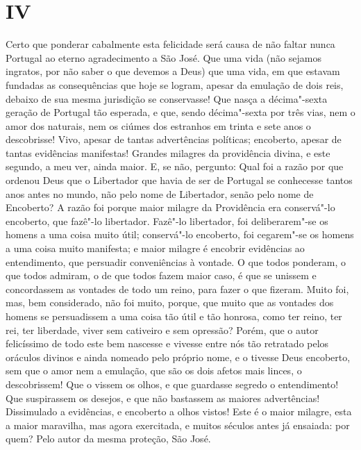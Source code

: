 \section*{IV}

Certo que ponderar cabalmente esta felicidade será causa de não faltar
nunca Portugal ao eterno agradecimento a São José. Que uma vida (não
sejamos ingratos, por não saber o que devemos a Deus) que uma vida, em
que estavam fundadas as consequências que hoje se logram, apesar da
emulação de dois reis, debaixo de sua mesma jurisdição se conservasse!
Que nasça a décima"-sexta geração de Portugal tão esperada, e que, sendo
décima"-sexta por três vias, nem o amor dos naturais, nem os ciúmes dos
estranhos em trinta e sete anos o descobrisse! Vivo, apesar de tantas
advertências políticas; encoberto, apesar de tantas evidências
manifestas! Grandes milagres da providência divina, e este segundo, a
meu ver, ainda maior. E, se não, pergunto: Qual foi a razão por que
ordenou Deus que o Libertador que havia de ser de Portugal se conhecesse
tantos anos antes no mundo, não pelo nome de Libertador, senão pelo nome
de Encoberto? A razão foi porque maior milagre da Providência era
conservá"-lo encoberto, que fazê"-lo libertador. Fazê"-lo libertador, foi
deliberarem"-se os homens a uma coisa muito útil; conservá"-lo encoberto,
foi cegarem"-se os homens a uma coisa muito manifesta; e maior milagre é
encobrir evidências ao entendimento, que persuadir conveniências à
vontade. O que todos ponderam, o que todos admiram, o de que todos fazem
maior caso, é que se unissem e concordassem as vontades de todo um
reino, para fazer o que fizeram. Muito foi, mas, bem considerado, não
foi muito, porque, que muito que as vontades dos homens se persuadissem
a uma coisa tão útil e tão honrosa, como ter reino, ter rei, ter
liberdade, viver sem cativeiro e sem opressão? Porém, que o autor
felicíssimo de todo este bem nascesse e vivesse entre nós tão retratado
pelos oráculos divinos e ainda nomeado pelo próprio nome, e o tivesse
Deus encoberto, sem que o amor nem a emulação, que são os dois afetos
mais linces, o descobrissem! Que o vissem os olhos, e que guardasse
segredo o entendimento! Que suspirassem os desejos, e que não bastassem
as maiores advertências! Dissimulado a evidências, e encoberto a olhos
vistos! Este é o maior milagre, esta a maior maravilha, mas agora
exercitada, e muitos séculos antes já ensaiada: por quem? Pelo autor da
mesma proteção, São José.

